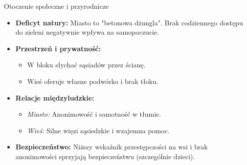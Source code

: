 \begin{frame}{Otoczenie społeczne i przyrodnicze}
    \begin{itemize}
        \item \textbf{Deficyt natury:} Miasto to "betonowa dżungla". Brak codziennego dostępu do zieleni negatywnie wpływa na samopoczucie.
        
        \item \textbf{Przestrzeń i prywatność:}
        \begin{itemize}
            \item W bloku słychać sąsiadów przez ścianę.
            \item Wieś oferuje własne podwórko i brak tłoku.
        \end{itemize}

        \item \textbf{Relacje międzyludzkie:}
        \begin{itemize}
            \item \textit{Miasto:} Anonimowość i samotność w tłumie.
            \item \textit{Wieś:} Silne więzi sąsiedzkie i wzajemna pomoc.
        \end{itemize}

        \item \textbf{Bezpieczeństwo:} Niższy wskaźnik przestępczości na wsi i brak anonimowości sprzyjają bezpieczeństwu (szczególnie dzieci).
    \end{itemize}
\end{frame}

